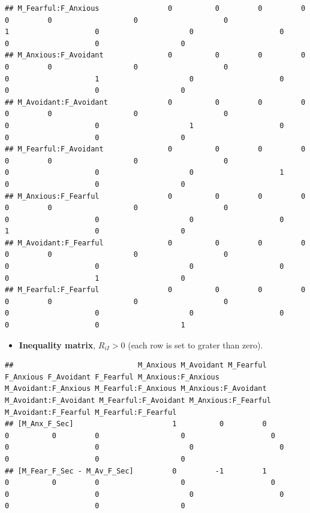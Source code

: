 \documentclass[
]{book}
\providecommand{\tightlist}{%
  \setlength{\itemsep}{0pt}\setlength{\parskip}{0pt}}
\begin{document}
\begin{verbatim}
## M_Fearful:F_Anxious                0          0         0         0          0         0                   0                    0                   1                    0                     0                    0                   0                    0                   0
## M_Anxious:F_Avoidant               0          0         0         0          0         0                   0                    0                   0                    1                     0                    0                   0                    0                   0
## M_Avoidant:F_Avoidant              0          0         0         0          0         0                   0                    0                   0                    0                     1                    0                   0                    0                   0
## M_Fearful:F_Avoidant               0          0         0         0          0         0                   0                    0                   0                    0                     0                    1                   0                    0                   0
## M_Anxious:F_Fearful                0          0         0         0          0         0                   0                    0                   0                    0                     0                    0                   1                    0                   0
## M_Avoidant:F_Fearful               0          0         0         0          0         0                   0                    0                   0                    0                     0                    0                   0                    1                   0
## M_Fearful:F_Fearful                0          0         0         0          0         0                   0                    0                   0                    0                     0                    0                   0                    0                   1
\end{verbatim}

\begin{itemize}
\tightlist
\item
  \textbf{Inequality matrix}, \(R_{iI} > 0\) (each row is set to grater than zero).
\end{itemize}

\begin{verbatim}
##                             M_Anxious M_Avoidant M_Fearful F_Anxious F_Avoidant F_Fearful M_Anxious:F_Anxious M_Avoidant:F_Anxious M_Fearful:F_Anxious M_Anxious:F_Avoidant M_Avoidant:F_Avoidant M_Fearful:F_Avoidant M_Anxious:F_Fearful M_Avoidant:F_Fearful M_Fearful:F_Fearful
## [M_Anx_F_Sec]                       1          0         0         0          0         0                   0                    0                   0                    0                     0                    0                   0                    0                   0
## [M_Fear_F_Sec - M_Av_F_Sec]         0         -1         1         0          0         0                   0                    0                   0                    0                     0                    0                   0                    0                   0
\end{verbatim}
\end{document}
